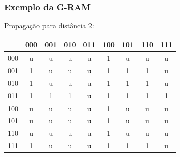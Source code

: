 \documentclass{beamer}
\begin{document}
\begin{frame}
    \frametitle{Exemplo da G-RAM}
    Propagação para distância 2:

    \begin{table}
        \centering
        \begin{tabular}{|c|c|c|c|c|c|c|c|c|}
            \hline
                &       000 &       001 &       010 &       011 &       100 &       101 &       110 &       111\\
            \hline
            000 &        u  &        u  &        u  &        u  & \alert 1  &        u  &        u  &        u \\
            \hline
            001 & \alert 1  &        u  &        u  &        u  &        1  & \alert 1  & \alert 1  &        u \\
            \hline
            010 & \alert 1  &        u  &        u  &        u  &        1  & \alert 1  & \alert 1  &        u \\
            \hline
            011 &        1  & \alert 1  & \alert 1  &        u  &        1  &        1  &        1  & \alert 1 \\
            \hline
            100 &        u  &        u  &        u  &        u  &        1  &        u  &        u  &        u \\
            \hline
            101 &        u  &        u  &        u  &        u  & \alert 1  &        u  &        u  &        u \\
            \hline
            110 &        u  &        u  &        u  &        u  & \alert 1  &        u  &        u  &        u \\
            \hline
            111 & \alert 1  &        u  &        u  &        u  &        1  & \alert 1  & \alert 1  &        u \\
            \hline

        \end{tabular}
    \end{table}
\end{frame}
\end{document}
